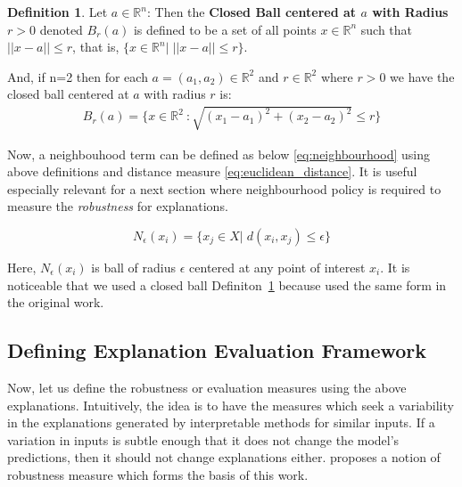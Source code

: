 \documentclass[english]{tktltiki2}
\theoremstyle{definition}
\newtheorem{definition}[thm]{Definition}
\theoremstyle{remark}
\newcommand{\onespace}{\;}
\begin{document}
\begin{definition}\label{def:2}{Let $a \in {\mathbb{R}}^n$: Then the \textbf{Closed Ball centered at $a$ with Radius $r > 0$} denoted $B_{r}(a)$ is defined to be a set of all points $x \in {\mathbb{R}}^n$ such that $||x-a|| \leq r$, that is, $\{x \in {\mathbb{R}}^n |\;||x - a|| \leq r\}.$}
\end{definition}
And, if n=2 then for each $a = (a_1,a_2) \in {\mathbb{R}}^2$ and $r \in {\mathbb{R}}^2$ where $r > 0$ we have the closed ball centered at $a$ with radius $r$ is:
\begin{align*}
B_{r}(a) = \{x \in {\mathbb{R}}^2\ : \sqrt{(x_1 - a_1)^2 + (x_2 - a_2)^2} \leq r\}
\end{align*}

Now, a neighbouhood term can be defined as below \eqref{eq:neighbourhood} using above definitions and distance measure \eqref{eq:euclidean_distance}. It is useful especially relevant for a next section where neighbourhood policy is required to measure the \textit{robustness} for explanations. 

\begin{equation}\label{eq:neighbourhood}
N_{\epsilon}(x_i) = \{x_j \in X| \onespace d(x_i, x_j) \leq \epsilon\}
\end{equation}  

Here, $N_{\epsilon}(x_{i})$ is ball of radius $\epsilon$ centered at any point of interest $x_i$. It is noticeable that we used a closed ball Definiton~\ref{def:2} because \citep{alvarez2018robustness} used the same form in the original work.

\subsection{Defining Explanation Evaluation Framework}\label{sec:defining_explanation_evaluation_framework} %

Now, let us define the robustness or evaluation measures using the above explanations. Intuitively, the idea is to have the measures which seek a variability in the explanations generated by interpretable methods for similar inputs. If a variation in inputs is subtle enough that it does not change the model's predictions, then it should not change explanations either. \citet{alvarez2018robustness} proposes a notion of robustness measure which forms the basis of this work.
\end{document}
